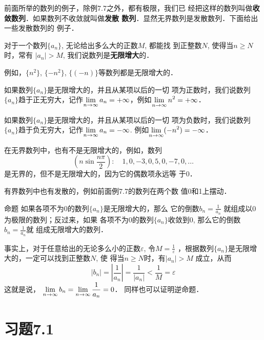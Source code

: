 前面所举的数列的例子，除例7.7之外，都有极限，我们已
经把这样的数列叫做\textbf{收敛数列}．如果数列不收敛就叫做\textbf{发散
数列}．显然无界数列是发散数列．下面给出一些发散数列的
例子．

对于一个数列$\{a_n\}$, 无论给出多么大的正数$M$, 都能找
到正整数$N$, 使得当$n\ge N$时，常有
$|a_n|>M$, 
我们说数列是\textbf{无限增大}的．

例如，$\{n^2\}$, $\{-n^2\}$, $\{(-n)\}$等数列都是无限增大的．

如果数列$\{a_n\}$是无限增大的，并且从某项以后的一切
项为正数时，我们说数列$\{a_n\}$趋于正无穷大，记作$\displaystyle\lim_{n\to\infty}a_n=+\infty$，例如$\displaystyle\lim_{n\to\infty}n^2=+\infty$．

如果数列$\{a_n\}$是无限增大的，并且从某项以后的一切
项为负数时，我们说数列$\{a_n\}$趋于负无穷大，记作$\displaystyle\lim_{n\to\infty}a_n=-\infty$. 例如$\displaystyle\lim_{n\to\infty}(-n^2)=-\infty$．

在无界数列中，也有不是无限增大的，例如，数列
\[\left(n\sin\frac{n\pi}{2}\right):\quad 1,0,-3,0,5,0,-7,0,\ldots\]
是无界的，但不是无限增大的，因为它的偶数项永远等
于0．

有界数列中也有发散的，例如前面例7.7的数列在两个数
值0和1上摆动．

\begin{blk}{命题}
    如果各项不为0的数列$\{a_n\}$是无限增大的，那么
它的倒数$b_n=\frac{1}{a_n}$
就组成以0为极限的数列；反过来，如果
各项不为0的数列$\{a_n\}$收敛到0, 那么它的倒数$b_n=\frac{1}{a_n}$就
组成无限增大的数列．
\end{blk}
 
事实上，对于任意给出的无论多么小的正数$\varepsilon$, 令$M=\frac{1}{\varepsilon}$
，根据数列$\{a_n\}$是无限增大的，一定可以找到正整数$N$, 使
得当$n\ge N$时，有$|a_n|>M$
成立，从而
\[|b_n|=\left|\frac{1}{a_n}\right|=\frac{1}{|a_n|}<\frac{1}{M}=\varepsilon\]
这就是说，
$\displaystyle\lim_{n\to\infty}b_n=\displaystyle\lim_{n\to\infty}\dfrac{1}{a_n}=0$．
同样也可以证明逆命题．

\section*{习题7.1}

